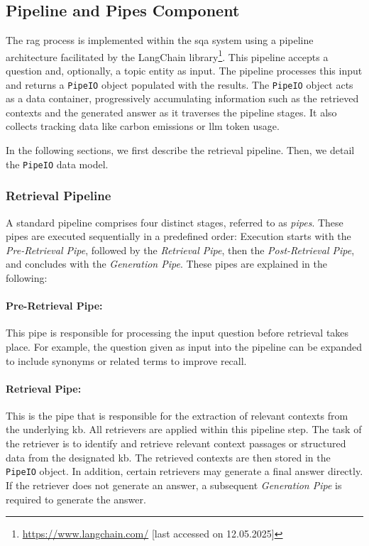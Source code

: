 \subsection{Pipeline and Pipes Component}

The \gls{rag} process is implemented within the \gls{sqa} system using a pipeline architecture facilitated by the LangChain library\footnote{\url{https://www.langchain.com/} [last accessed on 12.05.2025]}. This pipeline accepts a question and, optionally, a topic entity as input. The pipeline processes this input and returns a \texttt{PipeIO} object populated with the results. The \texttt{PipeIO} object acts as a data container, progressively accumulating information such as the retrieved contexts and the generated answer as it traverses the pipeline stages. It also collects tracking data like carbon emissions or \gls{llm} token usage. 

In the following sections, we first describe the retrieval pipeline. Then, we detail the \texttt{PipeIO} data model.

\subsubsection{Retrieval Pipeline}
A standard pipeline comprises four distinct stages, referred to as \emph{pipes}. These pipes are executed sequentially in a predefined order: Execution starts with the \emph{Pre-Retrieval Pipe}, followed by the \emph{Retrieval Pipe}, then the \emph{Post-Retrieval Pipe}, and concludes with the \emph{Generation Pipe}. These pipes are explained in the following:


\paragraph{Pre-Retrieval Pipe:} 
This pipe is responsible for processing the input question before retrieval takes place. For example, the question given as input into the pipeline can be expanded to include synonyms or related terms to improve recall.

\paragraph{Retrieval Pipe:}
This is the pipe that is responsible for the extraction of relevant contexts from the underlying \gls{kb}. All retrievers are applied within this pipeline step. The task of the retriever is to identify and retrieve relevant context passages or structured data from the designated \gls{kb}. The retrieved contexts are then stored in the \texttt{PipeIO} object. In addition, certain retrievers may generate a final answer directly. If the retriever does not generate an answer, a subsequent \emph{Generation Pipe} is required to generate the answer.

